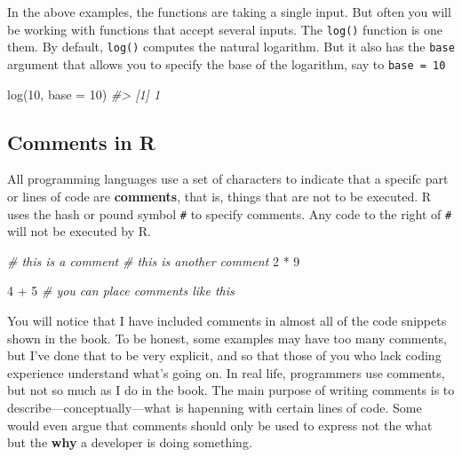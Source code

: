 \documentclass[
]{book}
\newenvironment{Shaded}{\begin{snugshade}}{\end{snugshade}}
\newcommand{\AttributeTok}[1]{\textcolor[rgb]{0.77,0.63,0.00}{#1}}
\newcommand{\CommentTok}[1]{\textcolor[rgb]{0.56,0.35,0.01}{\textit{#1}}}
\newcommand{\DecValTok}[1]{\textcolor[rgb]{0.00,0.00,0.81}{#1}}
\newcommand{\FunctionTok}[1]{\textcolor[rgb]{0.00,0.00,0.00}{#1}}
\newcommand{\NormalTok}[1]{#1}
\newcommand{\SpecialCharTok}[1]{\textcolor[rgb]{0.00,0.00,0.00}{#1}}
\begin{document}
In the above examples, the functions are taking a single input. But often you
will be working with functions that accept several inputs. The \texttt{log()} function
is one them. By default, \texttt{log()} computes the natural logarithm. But it also
has the \texttt{base} argument that allows you to specify the base of the logarithm,
say to \texttt{base\ =\ 10}

\begin{Shaded}
\begin{Highlighting}[]
\FunctionTok{log}\NormalTok{(}\DecValTok{10}\NormalTok{, }\AttributeTok{base =} \DecValTok{10}\NormalTok{)}
\CommentTok{\#\textgreater{} [1] 1}
\end{Highlighting}
\end{Shaded}

\hypertarget{comments-in-r}{%
\subsection{Comments in R}\label{comments-in-r}}

All programming languages use a set of characters to indicate that a
specifc part or lines of code are \textbf{comments}, that is, things that are
not to be executed. R uses the hash or pound symbol \texttt{\#} to specify comments.
Any code to the right of \texttt{\#} will not be executed by R.

\begin{Shaded}
\begin{Highlighting}[]
\CommentTok{\# this is a comment}
\CommentTok{\# this is another comment}
\DecValTok{2} \SpecialCharTok{*} \DecValTok{9}

\DecValTok{4} \SpecialCharTok{+} \DecValTok{5}  \CommentTok{\# you can place comments like this}
\end{Highlighting}
\end{Shaded}

You will notice that I have included comments in almost all of the code
snippets shown in the book. To be honest, some examples may have too many
comments, but I've done that to be very explicit, and so that those of you
who lack coding experience understand what's going on. In real life, programmers
use comments, but not so much as I do in the book. The main purpose of
writing comments is to describe---conceptually---what is hapenning with certain
lines of code. Some would even argue that comments should only be used to
express not the what but the \textbf{why} a developer is doing something.
\end{document}
